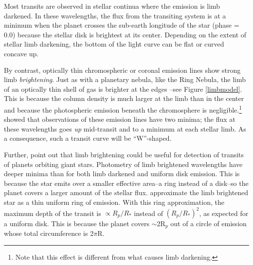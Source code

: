 \documentclass[manuscript]{aastex}
\begin{document}
Most transits are observed in stellar continua where the emission is limb darkened. In these wavelengths, the flux from the transiting system is at a minimum when the planet crosses the sub-earth longitude of the star (phase = 0.0) because the stellar disk is brightest at its center. Depending on the extent of stellar limb darkening, the bottom of the light curve can be flat or curved concave up.

%

By contrast, optically thin
chromospheric or coronal emission lines show strong limb {\it brightening}. Just as with a planetary
nebula, like the Ring Nebula, the limb of an optically thin shell of
gas is brighter at the edges --see Figure \ref{limbmodel}. This is because the column density is much larger at the limb than in the center and because the photospheric emission beneath the chromosphere is negligible.\footnote{Note
that this effect is different from what causes limb darkening.} \citet{assef} showed that observations of these emission lines have two minima; the flux at these wavelengths goes
{\it up} mid-transit and to a minimum at each stellar limb. As a
consequence, such a transit curve will be ``W''-shaped.

Further, \citet{assef} point out that limb brightening could be
useful for detection of transits of planets orbiting giant stars. Photometry of limb brightened wavelengths have
deeper minima than for both limb darkened and uniform disk
emission. This is because the star emits over a smaller effective area--a ring instead of a disk--so the planet covers a larger amount of the
stellar flux. \citet{assef} approximate the limb brightened
star as a thin uniform ring of emission. With this ring approximation, the maximum depth
of the transit is  $\propto R_p/R_*$ instead of $(R_p/R_*)^2$,
as expected for a uniform disk. This is because the planet covers $\sim$2R$_p$ out of a circle of emission whose total circumference is 2$\pi$R. 
\end{document}
